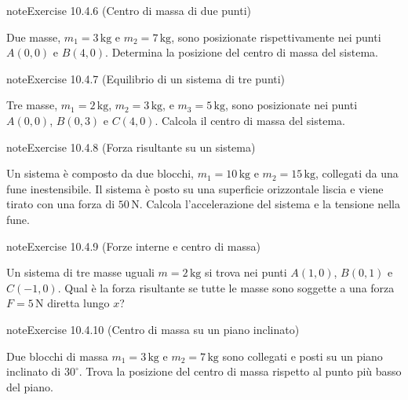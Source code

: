 \documentclass[letterpaper,10pt,italian]{jupyterBook}
\begin{document}
\begin{sphinxadmonition}{note}{Exercise 10.4.6 (Centro di massa di due punti)}



\sphinxAtStartPar
Due masse, \(m_1 = 3 \, \text{kg}\) e \(m_2 = 7 \, \text{kg}\), sono posizionate rispettivamente nei punti \(A(0, 0)\) e \(B(4, 0)\). Determina la posizione del centro di massa del sistema.
\end{sphinxadmonition}
 \label{exercise:ch/mechanics/statics-problems-exercise-6}

\begin{sphinxadmonition}{note}{Exercise 10.4.7 (Equilibrio di un sistema di tre punti)}



\sphinxAtStartPar
Tre masse, \(m_1 = 2 \, \text{kg}\), \(m_2 = 3 \, \text{kg}\), e \(m_3 = 5 \, \text{kg}\), sono posizionate nei punti \(A(0, 0)\), \(B(0, 3)\) e \(C(4, 0)\). Calcola il centro di massa del sistema.
\end{sphinxadmonition}
 \label{exercise:ch/mechanics/statics-problems-exercise-7}

\begin{sphinxadmonition}{note}{Exercise 10.4.8 (Forza risultante su un sistema)}



\sphinxAtStartPar
Un sistema è composto da due blocchi, \(m_1 = 10 \, \text{kg}\) e \(m_2 = 15 \, \text{kg}\), collegati da una fune inestensibile. Il sistema è posto su una superficie orizzontale liscia e viene tirato con una forza di \(50 \, \text{N}\). Calcola l’accelerazione del sistema e la tensione nella fune.
\end{sphinxadmonition}
 \label{exercise:ch/mechanics/statics-problems-exercise-8}

\begin{sphinxadmonition}{note}{Exercise 10.4.9 (Forze interne e centro di massa)}



\sphinxAtStartPar
Un sistema di tre masse uguali \(m = 2 \, \text{kg}\) si trova nei punti \(A(1, 0)\), \(B(0, 1)\) e \(C(-1, 0)\). Qual è la forza risultante se tutte le masse sono soggette a una forza \(F = 5 \, \text{N}\) diretta lungo \(x\)?
\end{sphinxadmonition}
 \label{exercise:ch/mechanics/statics-problems-exercise-9}

\begin{sphinxadmonition}{note}{Exercise 10.4.10 (Centro di massa su un piano inclinato)}



\sphinxAtStartPar
Due blocchi di massa \(m_1 = 3 \, \text{kg}\) e \(m_2 = 7 \, \text{kg}\) sono collegati e posti su un piano inclinato di \(30^\circ\). Trova la posizione del centro di massa rispetto al punto più basso del piano.
\end{sphinxadmonition}
\end{document}
